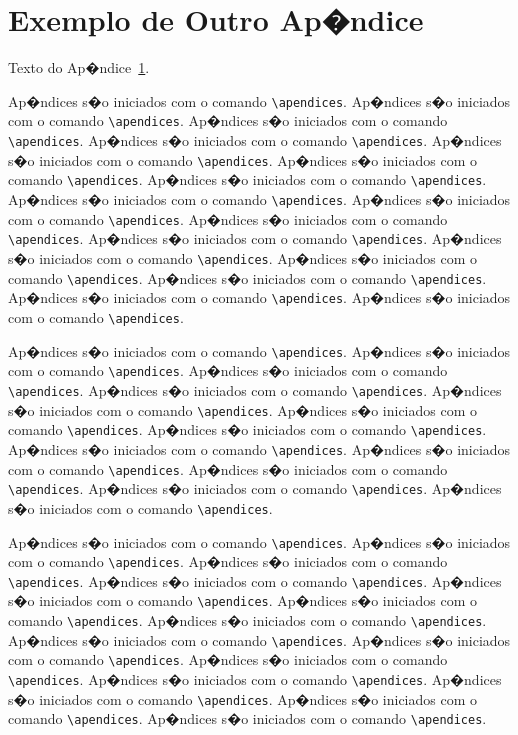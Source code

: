\chapter{Exemplo de Outro Ap�ndice}
\label{apend:2}
Texto do Ap�ndice~\ref{apend:2}.

Ap�ndices s�o iniciados com o comando \verb|\apendices|.
Ap�ndices s�o iniciados com o comando \verb|\apendices|.
Ap�ndices s�o iniciados com o comando \verb|\apendices|.
Ap�ndices s�o iniciados com o comando \verb|\apendices|.
Ap�ndices s�o iniciados com o comando \verb|\apendices|.
Ap�ndices s�o iniciados com o comando \verb|\apendices|.
Ap�ndices s�o iniciados com o comando \verb|\apendices|.
Ap�ndices s�o iniciados com o comando \verb|\apendices|.
Ap�ndices s�o iniciados com o comando \verb|\apendices|.
Ap�ndices s�o iniciados com o comando \verb|\apendices|.
Ap�ndices s�o iniciados com o comando \verb|\apendices|.
Ap�ndices s�o iniciados com o comando \verb|\apendices|.
Ap�ndices s�o iniciados com o comando \verb|\apendices|.
Ap�ndices s�o iniciados com o comando \verb|\apendices|.
Ap�ndices s�o iniciados com o comando \verb|\apendices|.
Ap�ndices s�o iniciados com o comando \verb|\apendices|.

Ap�ndices s�o iniciados com o comando \verb|\apendices|.
Ap�ndices s�o iniciados com o comando \verb|\apendices|.
Ap�ndices s�o iniciados com o comando \verb|\apendices|.
Ap�ndices s�o iniciados com o comando \verb|\apendices|.
Ap�ndices s�o iniciados com o comando \verb|\apendices|.
Ap�ndices s�o iniciados com o comando \verb|\apendices|.
Ap�ndices s�o iniciados com o comando \verb|\apendices|.
Ap�ndices s�o iniciados com o comando \verb|\apendices|.
Ap�ndices s�o iniciados com o comando \verb|\apendices|.
Ap�ndices s�o iniciados com o comando \verb|\apendices|.
Ap�ndices s�o iniciados com o comando \verb|\apendices|.
Ap�ndices s�o iniciados com o comando \verb|\apendices|.

Ap�ndices s�o iniciados com o comando \verb|\apendices|.
Ap�ndices s�o iniciados com o comando \verb|\apendices|.
Ap�ndices s�o iniciados com o comando \verb|\apendices|.
Ap�ndices s�o iniciados com o comando \verb|\apendices|.
Ap�ndices s�o iniciados com o comando \verb|\apendices|.
Ap�ndices s�o iniciados com o comando \verb|\apendices|.
Ap�ndices s�o iniciados com o comando \verb|\apendices|.
Ap�ndices s�o iniciados com o comando \verb|\apendices|.
Ap�ndices s�o iniciados com o comando \verb|\apendices|.
Ap�ndices s�o iniciados com o comando \verb|\apendices|.
Ap�ndices s�o iniciados com o comando \verb|\apendices|.
Ap�ndices s�o iniciados com o comando \verb|\apendices|.
Ap�ndices s�o iniciados com o comando \verb|\apendices|.
Ap�ndices s�o iniciados com o comando \verb|\apendices|.

